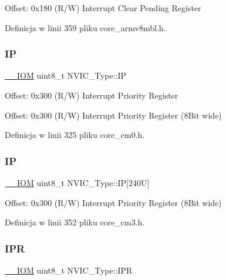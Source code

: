 Offset\+: 0x180 (R/W) Interrupt Clear Pending Register 

Definicja w linii 359 pliku core\+\_\+armv8mbl.\+h.

\mbox{\label{struct_n_v_i_c___type_a4eef47929a0d1317a107f1ac62e28464}} 
\subsubsection{\texorpdfstring{IP}{IP}\hspace{0.1cm}{\footnotesize\ttfamily [1/2]}}
{\footnotesize\ttfamily \hyperlink{core__sc300_8h_ab6caba5853a60a17e8e04499b52bf691}{\+\_\+\+\_\+\+I\+OM} uint8\+\_\+t N\+V\+I\+C\+\_\+\+Type\+::\+IP}

Offset\+: 0x300 (R/W) Interrupt Priority Register

Offset\+: 0x300 (R/W) Interrupt Priority Register (8\+Bit wide) 

Definicja w linii 325 pliku core\+\_\+cm0.\+h.

\mbox{\label{struct_n_v_i_c___type_a9a4341692e45d089a113986a3d344e98}} 
\subsubsection{\texorpdfstring{IP}{IP}\hspace{0.1cm}{\footnotesize\ttfamily [2/2]}}
{\footnotesize\ttfamily \hyperlink{core__sc300_8h_ab6caba5853a60a17e8e04499b52bf691}{\+\_\+\+\_\+\+I\+OM} uint8\+\_\+t N\+V\+I\+C\+\_\+\+Type\+::\+IP\mbox{[}240\+U\mbox{]}}

Offset\+: 0x300 (R/W) Interrupt Priority Register (8\+Bit wide) 

Definicja w linii 352 pliku core\+\_\+cm3.\+h.

\mbox{\label{struct_n_v_i_c___type_a71598b2d46c2fa6708a7908a1c63c43c}} 
\subsubsection{\texorpdfstring{I\+PR}{IPR}\hspace{0.1cm}{\footnotesize\ttfamily [1/2]}}
{\footnotesize\ttfamily \hyperlink{core__sc300_8h_ab6caba5853a60a17e8e04499b52bf691}{\+\_\+\+\_\+\+I\+OM} uint8\+\_\+t N\+V\+I\+C\+\_\+\+Type\+::\+I\+PR}

